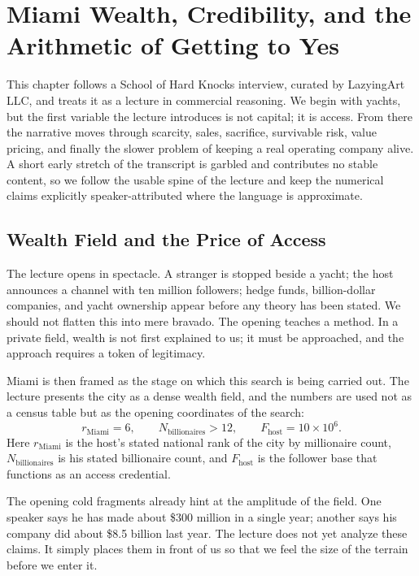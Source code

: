 \chapter{Miami Wealth, Credibility, and the Arithmetic of Getting to Yes}

This chapter follows a School of Hard Knocks interview, curated by LazyingArt LLC, and treats it as a lecture in commercial reasoning. We begin with yachts, but the first variable the lecture introduces is not capital; it is access. From there the narrative moves through scarcity, sales, sacrifice, survivable risk, value pricing, and finally the slower problem of keeping a real operating company alive. A short early stretch of the transcript is garbled and contributes no stable content, so we follow the usable spine of the lecture and keep the numerical claims explicitly speaker-attributed where the language is approximate.

\section{Wealth Field and the Price of Access}

The lecture opens in spectacle. A stranger is stopped beside a yacht; the host announces a channel with ten million followers; hedge funds, billion-dollar companies, and yacht ownership appear before any theory has been stated. We should not flatten this into mere bravado. The opening teaches a method. In a private field, wealth is not first explained to us; it must be approached, and the approach requires a token of legitimacy.

Miami is then framed as the stage on which this search is being carried out. The lecture presents the city as a dense wealth field, and the numbers are used not as a census table but as the opening coordinates of the search:
\begin{equation}
r_{\mathrm{Miami}} = 6,
\qquad
N_{\mathrm{billionaires}} > 12,
\qquad
F_{\mathrm{host}} = 10\times 10^{6}.
\end{equation}
Here \(r_{\mathrm{Miami}}\) is the host's stated national rank of the city by millionaire count, \(N_{\mathrm{billionaires}}\) is his stated billionaire count, and \(F_{\mathrm{host}}\) is the follower base that functions as an access credential.

The opening cold fragments already hint at the amplitude of the field. One speaker says he has made about \$300 million in a single year; another says his company did about \$8.5 billion last year. The lecture does not yet analyze these claims. It simply places them in front of us so that we feel the size of the terrain before we enter it.


